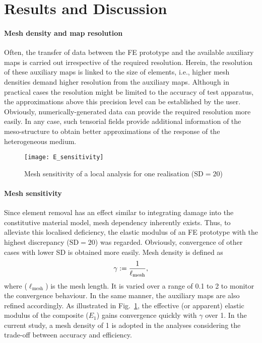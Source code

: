 \section{Results and Discussion}
	\paragraph{Mesh density and map resolution} Often, the transfer of data between the FE prototype and the available auxiliary maps is carried out irrespective of the required resolution. Herein, the resolution of these auxiliary maps is linked to the size of elements, i.e., higher mesh densities demand higher resolution from the auxiliary maps. Although in practical cases the resolution might be limited to the accuracy of test apparatus, the approximations above this precision level can be established by the user. Obviously, numerically-generated data can provide the required resolution more easily. In any case, such tensorial fields provide additional information of the meso-structure to obtain better approximations of the response of the heterogeneous medium.

	\begin{figure}[!b]{}
	  	\centering
	  	\texttt{[image: E\_sensitivity]}
		\caption{Mesh sensitivity of a local analysis for one realisation ($\text{SD}=20$)}
		\label{fig:mesh_sens}
	\end{figure}%

	\paragraph{Mesh sensitivity} Since element removal has an effect similar to integrating damage into the constitutive material model, mesh dependency inherently exists. Thus, to alleviate this localised deficiency, the elastic modulus of an FE prototype with the highest discrepancy ($\text{SD}=20$) was regarded. Obviously, convergence of other cases with lower SD is obtained more easily. Mesh density is defined as~\autocite{Javanbakht.2016b}
	\begin{equation}
		\gamma\mathrel{:=}\frac{1}{\ell_\text{mesh}},
	\end{equation}
	where ($\ell_\text{mesh}$) is the mesh length. It is varied over a range of 0.1 to 2 to monitor the convergence behaviour. In the same manner, the auxiliary maps are also refined accordingly. As illustrated in Fig.~\ref{fig:mesh_sens}, the effective (or apparent) elastic modulus of the composite ($E_1$) gains convergence quickly with $\gamma$ over 1. In the current study, a mesh density of 1 is adopted in the analyses considering the trade-off between accuracy and efficiency.

